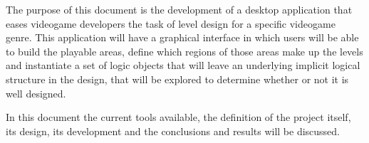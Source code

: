 The purpose of this document is the development of a desktop application that eases videogame developers the task of level design for a specific videogame genre. This application will have a graphical interface in which users will be able to build the playable areas, define which regions of those areas make up the levels and instantiate a set of logic objects that will leave an underlying implicit logical structure in the design, that will be explored to determine whether or not it is well designed.

In this document the current tools available, the definition of the project itself, its design, its development and the conclusions and results will be discussed.


